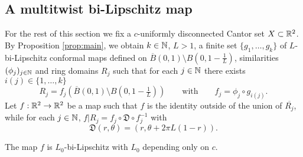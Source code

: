 \documentclass{amsart}
\begin{document}
\subsection{A multitwist bi-Lipschitz map}\label{sec:f}

For the rest of this section we fix a $c$-uniformly disconnected Cantor set $X \subset \mathbb{R}^2$. By Proposition \ref{prop:main}, we obtain $k\in\mathbb{N}$, $L>1$, a finite set $\{g_1,\dots,g_k\}$ of $L$-bi-Lipschitz conformal maps defined on $\overline{B}(0,1)\setminus B(0,1-\tfrac1{L})$, similarities $(\phi_j)_{j\in\mathbb{N}}$ and ring domains $R_j$ such that for each $j\in\mathbb{N}$ there exists $i(j)\in\{1,\dots,k\}$
\begin{equation} 
\label{eq:gj}
R_j = f_j( \overline{B}(0,1)\setminus B(0,1-\tfrac1{L}))\qquad \text{with}\qquad  f_j = \phi_j \circ g_{i(j)}.
\end{equation}
Let $f:\mathbb{R}^2 \to \mathbb{R}^2$ be a map such that $f$ is the identity outside of the union of $\overline{R_j}$, while for each $j\in\mathbb{N}$, $f|R_j = f_j \circ \mathfrak{D}\circ f_j^{-1}$ with
\[ \mathfrak{D}(r,\theta) = (r, \theta + 2\pi L(1-r)).\]

\begin{lemma}\label{lem:BLmap}
The map $f$ is $L_0$-bi-Lipschitz with $L_0$ depending only on $c$.
\end{lemma}
\end{document}
